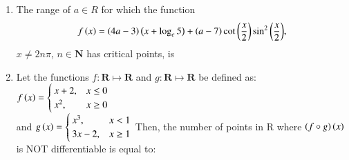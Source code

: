 \documentclass[journal]{IEEEtran}
\numberwithin{equation}{enumi}
\numberwithin{figure}{enumi}
\begin{document}
\begin{enumerate}
\begin{figure}[H]
    \end{figure}

    \item 
    The range of $a \in R$ for which the function 
    \begin{align*}
        f\left(x\right) = \left(4a - 3\right)\left(x + \log_e 5\right) + \left(a - 7\right)\cot{\ensuremath{\left(\frac{x}{2}\right)}}\sin^2{\left(\frac{x}{2}\right)},
    \end{align*}
    $x \neq 2n\pi$, $n\in\mathbf{N}$ has critical points, is
    
    \hfill{}
    \begin{enumerate}
    \end{enumerate}

    \item 
    Let the functions $f:\mathbf{R}\mapsto\mathbf{R}$ and $g:\mathbf{R}\mapsto\mathbf{R}$ be defined as:
    $f\left(x\right)=
    \begin{cases}
        x + 2, & x\leq0\\
        x^2, & x\geq0
    \end{cases}$ \\ and 
    $g\left(x\right)=
    \begin{cases}
        x^3, & x<1\\
        3x-2, & x\geq1
    \end{cases}$
    Then, the number of points in R where $\left(f\circ g\right)\left(x\right)$ is NOT differentiable is equal to: 
    
    \hfill{}
    \begin{enumerate}
    \end{enumerate}


\end{enumerate}
\end{document}

